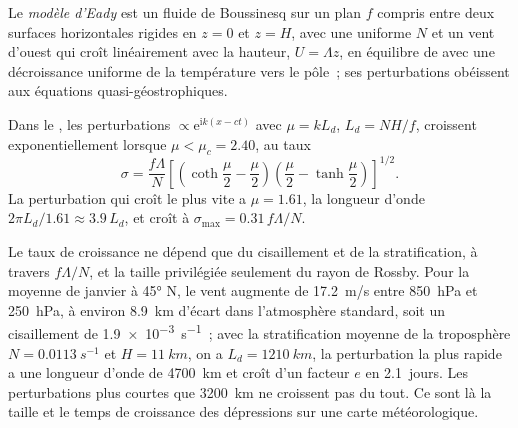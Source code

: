 \begin{definition}\label{def:b3:atmospheric-dynamics:eady}
Le \emph{modèle d'Eady} est un fluide de Boussinesq sur un
plan $f$ compris entre deux surfaces horizontales rigides en $z = 0$ et $z = H$, avec
une  uniforme $N$ et un vent d'ouest qui croît linéairement
avec la hauteur, $U = \Lambda z$, en équilibre de  avec une décroissance
uniforme de la température vers le pôle~; ses perturbations obéissent aux
équations quasi-géostrophiques.
\end{definition}

\begin{theorem}\label{thm:b3:atmospheric-dynamics:eady}
Dans le , les perturbations $\propto \mathrm e^{\mathrm ik(x - ct)}$
avec $\mu = kL_d$, $L_d = NH/f$, croissent exponentiellement lorsque $\mu < \mu_c =
2.40$, au taux
\[
\sigma = \frac{f\Lambda}{N}\left[\left(\coth\frac{\mu}{2} - \frac{\mu}{2}\right)\left(\frac{\mu}{2} - \tanh\frac{\mu}{2}\right)\right]^{1/2} .
\]
La perturbation qui croît le plus vite a $\mu = 1.61$, la longueur d'onde $2\pi L_d/1.61
\approx 3.9\,L_d$, et croît à $\sigma_{\max} = 0.31\,f\Lambda/N$.
\end{theorem}
\admitted

Le taux de croissance ne dépend que du cisaillement et de la stratification, à
travers $f\Lambda/N$, et la taille privilégiée seulement du rayon de Rossby. Pour la
moyenne de janvier à \ang{45} N, le vent augmente de \qty{17.2}{m/s} entre
\qty{850}{hPa} et \qty{250}{hPa}, à environ \qty{8.9}{km} d'écart dans
l'atmosphère standard, soit un cisaillement de \qty{1.9e-3}{s^{-1}}~; avec la
stratification moyenne de la troposphère $N = \qty{0.0113}{s^{-1}}$ et $H = \qty{11}{km}$, on a $L_d =
\qty{1210}{km}$, la perturbation la plus rapide a une longueur d'onde de \qty{4700}{km}
et croît d'un facteur $e$ en \num{2.1}~jours. Les perturbations plus courtes que
\qty{3200}{km} ne croissent pas du tout. Ce sont là la taille et le temps de
croissance des dépressions sur une carte météorologique.

